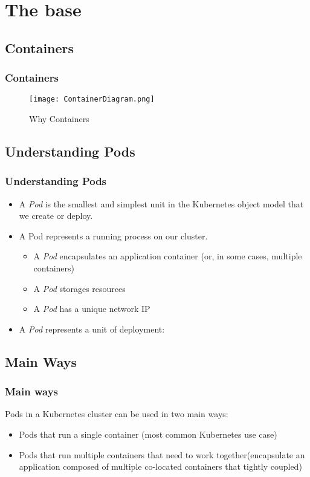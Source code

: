 
\section{The base}

\subsection{Containers}

\begin{frame}[fragile]
  \frametitle{Containers}
\begin{figure}[ht]
  \caption{Why Containers}
  \centering
  \texttt{[image: ContainerDiagram.png]}
  \label{fig:ContainerDiagram}
\end{figure}
\end{frame}

\subsection{Understanding Pods}

\begin{frame}
  \frametitle{Understanding Pods}
  \begin{itemize}
  \item<1->A \emph{Pod} is the smallest and simplest unit in the Kubernetes object model that we create or deploy.
  \item<2->A Pod represents a running process on our cluster.
    \begin{itemize}
    \item<3->A \emph{Pod} encapsulates an application container (or, in some cases, multiple containers)
    \item<4->A \emph{Pod} storages resources
    \item<5->A \emph{Pod} has a unique network IP
    \end{itemize}
  \item<6->A \emph{Pod} represents a unit of deployment:
  \end{itemize}
\end{frame}

\subsection{Main Ways}

\begin{frame}
  \frametitle{Main ways}
  Pods in a Kubernetes cluster can be used in two main ways:
  \begin{itemize}
  \item<2->Pods that run a single container (most common Kubernetes use case)
  \item<3->Pods that run multiple containers that need to work together(encapsulate an application composed of multiple co-located containers that tightly coupled)
  \end{itemize}
\end{frame}

